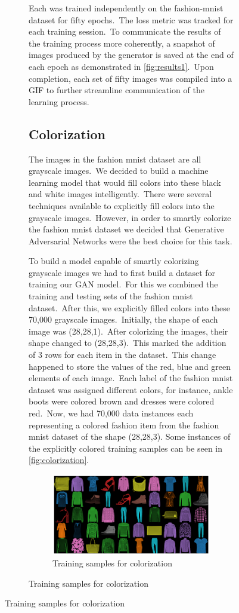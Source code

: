 \documentclass[conference]{IEEEtran}
\begin{document}
\begin{figure}[!h]
\begin{figure}[!h]
    Each was trained independently on the fashion-mnist dataset for fifty epochs.\ The loss metric was tracked for each training session.\ To communicate the results of the training process more coherently, a snapshot of images produced by the generator is saved at the end of each epoch as demonstrated in \autoref{fig:results1}.\ Upon completion, each set of fifty images was compiled into a GIF to further streamline communication of the learning process.

    \subsection{Colorization}\label{subsec:implementation-colorization}

    The images in the fashion mnist dataset are all grayscale images.\ We decided to build a machine learning model that would fill colors into these black and white images intelligently.\ There were several techniques available to explicitly fill colors into the grayscale images.\ However, in order to smartly colorize the fashion mnist dataset we decided that Generative Adversarial Networks were the best choice for this task.

    To build a model capable of smartly colorizing grayscale images we had to first build a dataset for training our GAN model.\ For this we combined the training and testing sets of the fashion mnist dataset.\ After this, we explicitly filled colors into these 70,000 grayscale images.\ Initially, the shape of each image was (28,28,1).\ After colorizing the images, their shape changed to (28,28,3).\ This marked the addition of 3 rows for each item in the dataset.\ This change happened to store the values of the red, blue and green elements of each image.\ Each label of the fashion mnist dataset was assigned different colors, for instance, ankle boots were colored brown and dresses were colored red.\ Now, we had 70,000 data instances each representing a colored fashion item from the fashion mnist dataset of the shape (28,28,3). Some instances of the explicitly colored training samples can be seen in \autoref{fig:colorization}.

    \begin{figure}
        \caption{Training samples for colorization}
        \label{fig:colorization}
        \centering
        \includegraphics[scale = 0.33]{Colorization_training_samples.png}
    \end{figure}


\end{figure}
\end{figure}
\end{document}
